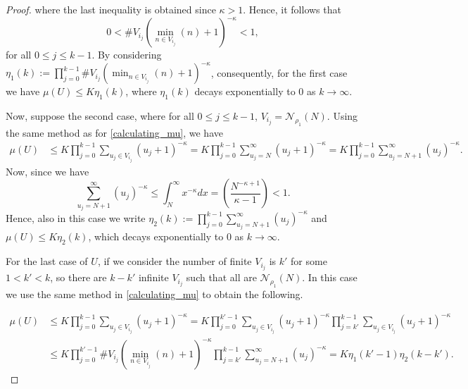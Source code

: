 \documentclass[11pt, reqno]{amsart}
\theoremstyle{plain}%
\theoremstyle{definition}
\theoremstyle{definition}
\def\N{\ensuremath{\mathbb N}}
\numberwithin{equation}{section}
\begin{document}
\begin{proof}
where the last inequality is obtained since $\kappa>1$. Hence, it follows that $$0< \#V_{i_j} (\min_{n\in V_{i_j}} (n)+1)^{-\kappa}<1,$$ for all $0\le j\le k-1$. By considering $\eta_1(k):=\prod_{j=0}^{k-1} \#V_{i_j} (\min_{n\in V_{i_j}} (n)+1)^{-\kappa}$, consequently, for the first case we have $\mu(U)\le  K\eta_1(k)$, where $ \eta_1(k)$ decays exponentially to 0 as $k\to \infty$.
 
 
 Now, suppose the second case, where for all $0\le j\le k-1$, $V_{i_j}=\mathcal{N}_{\rho_1}(N)$. Using the same method as for \eqref{calculating_mu}, we have
\begin{align*}
     \mu(U)&\le K  \prod_{j=0}^{k-1}\sum_{u_j\in V_{i_j}} (u_j+1)^{-\kappa}=K  \prod_{j=0}^{k-1}\sum_{u_j=N}^\infty (u_j+1)^{-\kappa}=K  \prod_{j=0}^{k-1}\sum_{u_j=N+1}^\infty (u_j)^{-\kappa}.
\end{align*}
Now, since we have
\begin{equation}\label{Ineq: Case Infin. of Proof of lwbd of E(hit)}
    \sum_{u_j=N+1}^\infty (u_j)^{-\kappa}\le \int_N^\infty x^{-\kappa}dx=\left(\frac{N^{-\kappa+1}}{\kappa-1}\right)<1.
\end{equation}
Hence, also in this case we write $\eta_2(k):= \prod_{j=0}^{k-1}\sum_{u_j=N+1}^\infty (u_j)^{-\kappa}$ and $\mu(U)\le  K\eta_2(k)$, which decays exponentially to 0 as $k\to \infty$.



 



For the last case of $U$, if we consider the number of finite $V_{i_j}$ is $k'$ for some $1<k'<k$, so there are $k-k'$ infinite $V_{i_j}$ such that all are $\mathcal{N}_{\rho_1}(N)$. In this case we use the same method in \eqref{calculating_mu} to obtain the following.

\begin{align*}
    \mu(U)&\le K  \prod_{j=0}^{k-1}\sum_{u_j\in V_{i_j}} (u_j+1)^{-\kappa}= K  \prod_{j=0}^{k'-1}\sum_{u_j\in V_{i_j}} (u_j+1)^{-\kappa} \prod_{j=k'}^{k-1}\sum_{u_j\in V_{i_j}} (u_j+1)^{-\kappa}\\& \le K \prod_{j=0}^{k'-1} \#V_{i_j} (\min_{n\in V_{i_j}} (n)+1)^{-\kappa} \prod_{j=k'}^{k-1}\sum_{u_j=N+1}^\infty (u_j)^{-\kappa}=K \eta_1(k'-1)\eta_2(k-k').
\end{align*}


\end{proof}
\end{document}
